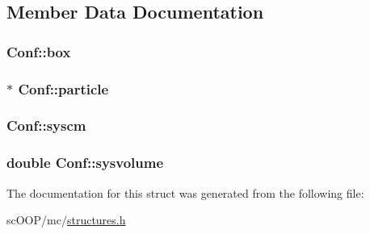 \subsection{Member Data Documentation}
\hypertarget{struct_conf_a98e73199812404fd886619f90f0b26e7}{
\subsubsection[{box}]{ Conf\+::box}}\label{struct_conf_a98e73199812404fd886619f90f0b26e7}
\hypertarget{struct_conf_ac0e11d5fd0a32540825f5e051ce07e40}{
\subsubsection[{particle}]{$\ast$ Conf\+::particle}}\label{struct_conf_ac0e11d5fd0a32540825f5e051ce07e40}
\hypertarget{struct_conf_a8d27bcc5bf535c39c7c0f17a078448d9}{
\subsubsection[{syscm}]{ Conf\+::syscm}}\label{struct_conf_a8d27bcc5bf535c39c7c0f17a078448d9}
\hypertarget{struct_conf_a0591e720e4f06449a7d37a8e3135ddb1}{
\subsubsection[{sysvolume}]{\setlength{\rightskip}{0pt plus 5cm}double Conf\+::sysvolume}}\label{struct_conf_a0591e720e4f06449a7d37a8e3135ddb1}


The documentation for this struct was generated from the following file\+:\begin{DoxyCompactItemize}
\item 
sc\+O\+O\+P/mc/\hyperlink{structures_8h}{structures.\+h}\end{DoxyCompactItemize}
